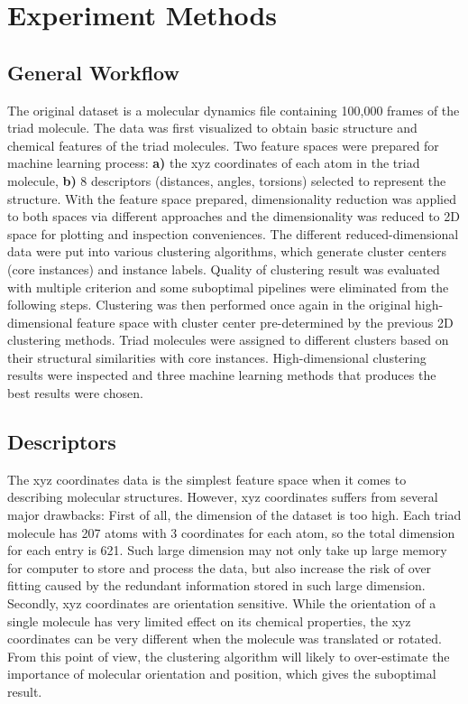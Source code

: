 \documentclass[a4paper]{article}
\begin{document}
\section{Experiment Methods}

\subsection{General Workflow}
The original dataset is a molecular dynamics file containing 100,000 frames of the triad molecule. The data was first visualized to obtain basic structure and chemical features of the triad molecules. Two feature spaces were prepared for machine learning process: \textbf{a)} the xyz coordinates of each atom in the triad molecule, \textbf{b)} 8 descriptors (distances, angles, torsions) selected to represent the structure. With the feature space prepared, dimensionality reduction was applied to both spaces via different approaches and the dimensionality was reduced to 2D space for plotting and inspection conveniences. The different reduced-dimensional data were put into various clustering algorithms, which generate cluster centers (core instances) and instance labels. Quality of clustering result was evaluated with multiple criterion and some suboptimal pipelines were eliminated from the following steps. Clustering was then performed once again in the original high-dimensional feature space with cluster center pre-determined by the previous 2D clustering methods. Triad molecules were assigned to different clusters based on their structural similarities with core instances. High-dimensional clustering results were inspected and three machine learning methods that produces the best results were chosen.

\subsection{Descriptors} \label{sec: descriptors}
The xyz coordinates data is the simplest feature space when it comes to describing molecular structures. However, xyz coordinates suffers from several major drawbacks: First of all, the dimension of the dataset is too high. Each triad molecule has 207 atoms with 3 coordinates for each atom, so the total dimension for each entry is 621. Such large dimension may not only take up large memory for computer to store and process the data, but also increase the risk of over fitting caused by the redundant information stored in such large dimension. Secondly, xyz coordinates are orientation sensitive. While the orientation of a single molecule has very limited effect on its chemical properties, the xyz coordinates can be very different when the molecule was translated or rotated. From this point of view, the clustering algorithm will likely to over-estimate the importance of molecular orientation and position, which gives the suboptimal result.
\end{document}
